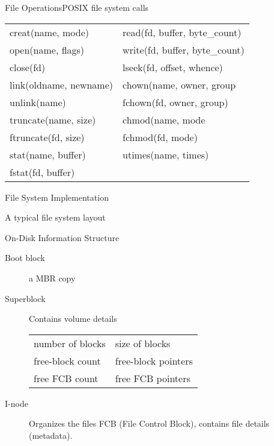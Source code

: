 \begin{frame}{File Operations}{POSIX file system calls}%
  \begin{tabular}{>{\ttfamily}l|>{\ttfamily}l}
    creat(name, mode)&read(fd, buffer, byte\_count)\\
    open(name, flags)&write(fd, buffer, byte\_count)\\
    close(fd)&lseek(fd, offset, whence)\\
    link(oldname, newname)&chown(name, owner, group\\
    unlink(name)&fchown(fd, owner, group)\\        
    truncate(name, size)&chmod(name, mode\\
    ftruncate(fd, size)&fchmod(fd, mode)\\
    stat(name, buffer)&utimes(name, times)\\
    fstat(fd, buffer)&\\
  \end{tabular}
\end{frame}

\begin{frame}{File System Implementation}
  \begin{block}{A typical file system layout}
    \begin{center}
    \end{center}
  \end{block}
  \begin{center}
  \end{center}
\end{frame}

\begin{frame}{On-Disk Information Structure}
  \begin{description}
  \item[Boot block] a MBR copy
  \item[Superblock] Contains volume details
    \begin{center}
      \begin{tabular}{ll}
        number of blocks& size of blocks\\
        free-block count& free-block pointers\\
        free FCB count& free FCB pointers
      \end{tabular}
    \end{center}
  \item[I-node] Organizes the files \alert{FCB (File Control Block)},
    contains file details (metadata).
  \end{description}
\end{frame}

